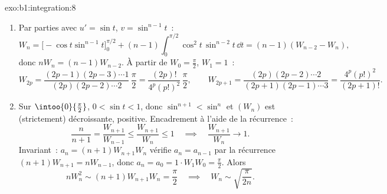 \begin{solution}{exo:b1:integration:8}
\begin{enumerate}
  \item Par parties avec $u' = \sin t$, $v = \sin^{n-1} t$~:
        \[
        W_n = \bigl[-\cos t\sin^{n-1}t\bigr]_0^{\pi/2}
        + (n-1)\int_0^{\pi/2} \cos^2 t\,\sin^{n-2} t\,\dd t
        = (n-1)(W_{n-2} - W_n),
        \]
        donc $nW_n = (n-1)W_{n-2}$. À partir de $W_0 = \frac\pi2$,
        $W_1 = 1$~:
        \[
        W_{2p} = \frac{(2p-1)(2p-3)\cdots 1}{(2p)(2p-2)\cdots 2}\,
        \frac{\pi}{2} = \frac{(2p)!}{4^p (p!)^2}\,\frac\pi2,
        \qquad
        W_{2p+1} = \frac{(2p)(2p-2)\cdots 2}{(2p+1)(2p-1)\cdots 3}
        = \frac{4^p (p!)^2}{(2p+1)!} .
        \]
  \item Sur $\intoo{0}{\frac\pi2}$, $0 < \sin t < 1$, donc
        $\sin^{n+1} < \sin^n$ et $(W_n)$ est (strictement)
        décroissante, positive. Encadrement à l'aide de la
        récurrence~:
        \[
        \frac{n}{n+1} = \frac{W_{n+1}}{W_{n-1}}
        \leq \frac{W_{n+1}}{W_n} \leq 1
        \quad\implies\quad \frac{W_{n+1}}{W_n} \to 1 .
        \]
        Invariant~: $a_n = (n+1)W_{n+1}W_n$ vérifie $a_n = a_{n-1}$
        par la récurrence $(n+1)W_{n+1} = nW_{n-1}$, donc $a_n = a_0
        = 1 \cdot W_1 W_0 = \frac\pi2$. Alors
        \[
        n W_n^2 \sim (n+1) W_{n+1} W_n = \frac\pi2
        \quad\implies\quad
        W_n \sim \sqrt{\frac{\pi}{2n}} .
        \]
\end{enumerate}
\end{solution}

